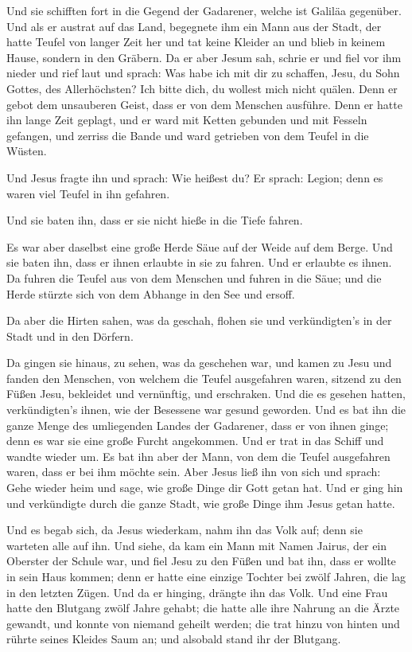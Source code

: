  Und sie schifften fort in die Gegend der Gadarener,
welche ist Galiläa gegenüber.  Und als er austrat auf das
Land, begegnete ihm ein Mann aus der Stadt, der hatte Teufel von langer
Zeit her und tat keine Kleider an und blieb in keinem Hause, sondern in
den Gräbern.  Da er aber Jesum sah, schrie er und fiel
vor ihm nieder und rief laut und sprach: Was habe ich mit dir zu
schaffen, Jesu, du Sohn Gottes, des Allerhöchsten? Ich bitte dich, du
wollest mich nicht quälen.  Denn er gebot dem unsauberen
Geist, dass er von dem Menschen ausführe. Denn er hatte ihn lange Zeit
geplagt, und er ward mit Ketten gebunden und mit Fesseln gefangen, und
zerriss die Bande und ward getrieben von dem Teufel in die Wüsten.

 Und Jesus fragte ihn und sprach: Wie heißest du? Er
sprach: Legion; denn es waren viel Teufel in ihn gefahren.

 Und sie baten ihn, dass er sie nicht hieße in die Tiefe
fahren.

 Es war aber daselbst eine große Herde Säue auf der Weide
auf dem Berge. Und sie baten ihn, dass er ihnen erlaubte in sie zu
fahren. Und er erlaubte es ihnen.  Da fuhren die Teufel
aus von dem Menschen und fuhren in die Säue; und die Herde stürzte sich
von dem Abhange in den See und ersoff.

 Da aber die Hirten sahen, was da geschah, flohen sie und
verkündigten's in der Stadt und in den Dörfern.

 Da gingen sie hinaus, zu sehen, was da geschehen war,
und kamen zu Jesu und fanden den Menschen, von welchem die Teufel
ausgefahren waren, sitzend zu den Füßen Jesu, bekleidet und vernünftig,
und erschraken.  Und die es gesehen hatten,
verkündigten's ihnen, wie der Besessene war gesund geworden.
 Und es bat ihn die ganze Menge des umliegenden Landes
der Gadarener, dass er von ihnen ginge; denn es war sie eine große
Furcht angekommen. Und er trat in das Schiff und wandte wieder um.
 Es bat ihn aber der Mann, von dem die Teufel ausgefahren
waren, dass er bei ihm möchte sein. Aber Jesus ließ ihn von sich und
sprach:  Gehe wieder heim und sage, wie große Dinge dir
Gott getan hat. Und er ging hin und verkündigte durch die ganze Stadt,
wie große Dinge ihm Jesus getan hatte.

 Und es begab sich, da Jesus wiederkam, nahm ihn das Volk
auf; denn sie warteten alle auf ihn.  Und siehe, da kam
ein Mann mit Namen Jairus, der ein Oberster der Schule war, und fiel
Jesu zu den Füßen und bat ihn, dass er wollte in sein Haus kommen;
 denn er hatte eine einzige Tochter bei zwölf Jahren, die
lag in den letzten Zügen. Und da er hinging, drängte ihn das Volk.
 Und eine Frau hatte den Blutgang zwölf Jahre gehabt; die
hatte alle ihre Nahrung an die Ärzte gewandt, und konnte von niemand
geheilt werden;  die trat hinzu von hinten und rührte
seines Kleides Saum an; und alsobald stand ihr der Blutgang.

